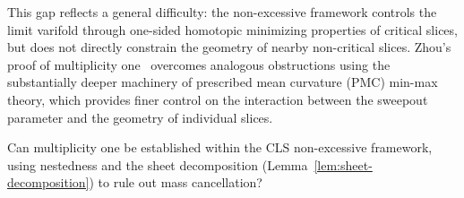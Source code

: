 This gap reflects a general difficulty: the non-excessive framework controls the limit varifold through one-sided homotopic minimizing properties of critical slices, but does not directly constrain the geometry of nearby non-critical slices. Zhou's proof of multiplicity one~\cite{Zho20} overcomes analogous obstructions using the substantially deeper machinery of prescribed mean curvature (PMC) min-max theory, which provides finer control on the interaction between the sweepout parameter and the geometry of individual slices.

\begin{question}\label{q:mult-one}
Can multiplicity one be established within the CLS non-excessive framework, using nestedness and the sheet decomposition (Lemma~\ref{lem:sheet-decomposition}) to rule out mass cancellation?
\end{question}
